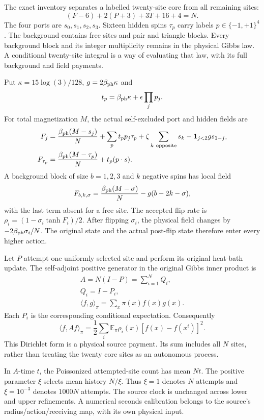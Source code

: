 The exact inventory separates a labelled twenty-site core from all remaining sites:
\[
 (F-6)+2(P+3)+3T+16+4=N.
\]
The four ports are $s_0,s_1,s_2,s_3$. Sixteen hidden spins $\tau_p$ carry labels $p\in\{-1,+1\}^4$. The background contains free sites and pair and triangle blocks. Every background block and its integer multiplicity remains in the physical Gibbs law. A conditional twenty-site integral is a way of evaluating that law, with its full background and field payments. 

Put $\kappa=15\log(3)/128$, $g=2\beta_{\rm ph}\kappa$ and
\[
 t_p=\beta_{\rm ph}\kappa+\epsilon\prod_jp_j.
\]
For total magnetization $M$, the actual self-excluded port and hidden fields are
\begin{align*}
 F_j={}&\frac{\beta_{\rm ph}(M-s_j)}N
       +\sum_p t_pp_j\tau_p
       +\zeta\sum_{k\ \mathrm{opposite}}s_k
       -\mathbf1_{j<2}g s_{1-j},\\
 F_{\tau_p}={}&\frac{\beta_{\rm ph}(M-\tau_p)}N+t_p(p\cdot s).
\end{align*}
A background block of size $b=1,2,3$ and $k$ negative spins has local field
\[
 F_{b,k,\sigma}=\frac{\beta_{\rm ph}(M-\sigma)}N
                         -g(b-2k-\sigma),
\]
with the last term absent for a free site. The accepted flip rate is $\rho_i=(1-\sigma_i\tanh F_i)/2$. After flipping $\sigma_i$, the physical field changes by $-2\beta_{\rm ph}\sigma_i/N$. The original state and the actual post-flip state therefore enter every higher action.

Let $P$ attempt one uniformly selected site and perform its original heat-bath update. The self-adjoint positive generator in the original Gibbs inner product is
\[
\begin{gathered}
A=N(I-P)=\sum_{i=1}^NQ_i,
 \\
Q_i=I-P_i,
 \\
\langle f,g\rangle_\pi=\sum_x\pi(x)f(x)g(x).
\end{gathered}
\]
Each $P_i$ is the corresponding conditional expectation. Consequently
\[
 \langle f,Af\rangle_\pi
 =\frac12\sum_i\mathbb E_\pi\rho_i(x)[f(x)-f(x^i)]^2.
\]
This Dirichlet form is a physical source payment. Its sum includes all $N$ sites, rather than treating the twenty core sites as an autonomous process.

In $A$-time $t$, the Poissonized attempted-site count has mean $Nt$. The positive parameter $\xi$ selects mean history $N/\xi$. Thus $\xi=1$ denotes $N$ attempts and $\xi=10^{-3}$ denotes $1000N$ attempts. The source clock is unchanged across lower and upper refinements. A numerical seconds calibration belongs to the source's radius/action/receiving map, with its own physical input.

